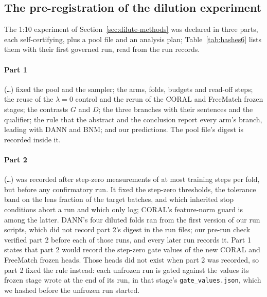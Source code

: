 \subsection{The pre-registration of the dilution experiment}
\label{sec:prereg-dilute}

The 1:10 experiment of Section~\ref{sec:dilute-methods} was declared in three parts, each
self-certifying, plus a pool file and an analysis plan; Table~\ref{tab:hashes6} lists them with
their first governed run, read from the run records.

\paragraph{Part 1} (\texttt{\dlShaPartOne\ldots}) fixed the pool and the sampler; the arms,
folds, budgets and read-off steps; the reuse of the $\lambda=0$ control and the rerun of the
CORAL and FreeMatch frozen stages; the contrasts $G$ and $D$; the three branches with their
sentences and the qualifier; the rule that the abstract and the conclusion report every arm's
branch, leading with DANN and BNM; and our \dlNPredWord{} predictions. The pool file's digest is
recorded inside it.

\paragraph{Part 2} (\texttt{\dlShaPartTwo\ldots}) was recorded after step-zero measurements of
at most \dlPartTwoMaxStepsWord{} training steps per fold, but before any confirmatory run. It
fixed the step-zero thresholds, the
tolerance band on the lens fraction of the target batches, and which inherited stop conditions
abort a run and which only log; CORAL's feature-norm guard is among the latter. DANN's four
diluted folds ran from the first version of our run scripts, which did not record part 2's
digest in the run files; our pre-run check verified part 2 before each of those runs, and every
later run records it. Part 1 states that part 2 would record the step-zero gate values of the
new CORAL and FreeMatch frozen heads. Those heads did not exist when part 2 was recorded, so
part 2 fixed the rule instead: each unfrozen run is gated against the values its frozen stage
wrote at the end of its run, in that stage's \texttt{gate\_values.json}, which we hashed before
the unfrozen run started.

